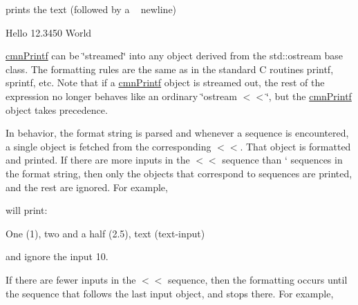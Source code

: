 prints the text (followed by a ~\newline
 newline)

\begin{DoxyVerb}Hello 12.3450 World
\end{DoxyVerb}


\hyperlink{classcmn_printf}{cmn\+Printf} can be \char`\"{}streamed\char`\"{} into any object derived from the std\+::ostream base class. The formatting rules are the same as in the standard C routines printf, sprintf, etc. Note that if a \hyperlink{classcmn_printf}{cmn\+Printf} object is streamed out, the rest of the expression no longer behaves like an ordinary \char`\"{}ostream $<$$<$\char`\"{}, but the \hyperlink{classcmn_printf}{cmn\+Printf} object takes precedence.

In behavior, the format string is parsed and whenever a \textquotesingle{}\textquotesingle{} sequence is encountered, a single object is fetched from the corresponding \textquotesingle{}$<$$<$\textquotesingle{}. That object is formatted and printed. If there are more inputs in the \textquotesingle{}$<$$<$\textquotesingle{} sequence than `\textquotesingle{} sequences in the format string, then only the objects that correspond to \textquotesingle{}\textquotesingle{} sequences are printed, and the rest are ignored. For example,




will print\+:

\begin{DoxyVerb}One (1), two and a half (2.5), text (text-input)
\end{DoxyVerb}


and ignore the input 10.

If there are fewer inputs in the \textquotesingle{}$<$$<$\textquotesingle{} sequence, then the formatting occurs until the \textquotesingle{}\textquotesingle{} sequence that follows the last input object, and stops there. For example,




